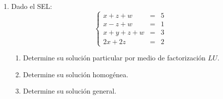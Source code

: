 \documentclass[12pt]{article}
\begin{document}
\begin{enumerate}
    \item Dado el SEL:
          $$\left\{\begin{array}{rcc}
                  x+z+w   & = & 5 \\
                  x-z+w   & = & 1 \\
                  x+y+z+w & = & 3 \\
                  2x+2z   & = & 2
              \end{array}\right.$$
          \begin{enumerate}
              \item Determine su soluci\'on particular por medio de factorizaci\'on $LU$.
              \item Determine su soluci\'on homog\'enea.
              \item Determine su soluci\'on general.
          \end{enumerate}

\end{enumerate}
\end{document}
